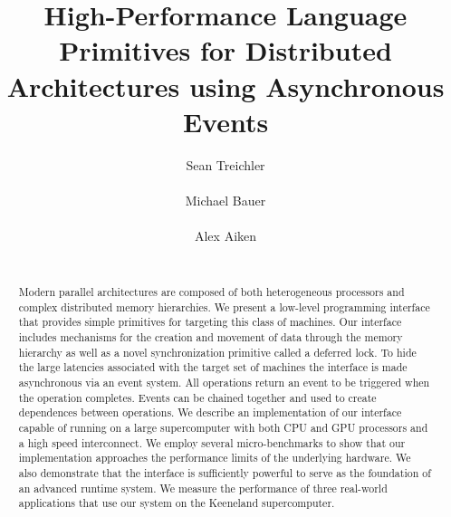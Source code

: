 \documentclass{sig-alternate}
\begin{document}
\title{High-Performance Language Primitives for Distributed Architectures using Asynchronous Events}
\author{
\alignauthor Sean Treichler\\
              \\
\alignauthor Michael Bauer \\
              \\
\alignauthor Alex Aiken \\
              \\
}
\maketitle

\begin{abstract}
Modern parallel architectures are composed of both heterogeneous processors
and complex distributed memory hierarchies.  We present a low-level programming
interface that provides simple primitives for targeting this class of
machines.  Our interface includes mechanisms for the creation and movement
of data through the memory hierarchy as well as a novel synchronization primitive 
called a deferred lock.  To hide the large latencies associated with the target
set of machines the interface is made asynchronous via an event system.  All
operations return an event to be triggered when the operation completes.  Events
can be chained together and used to create dependences between operations.
We describe an implementation of our interface capable of running on
a large supercomputer with both CPU and GPU processors and a high speed interconnect.
We employ several micro-benchmarks to show that our implementation approaches
the performance limits of the underlying hardware.
We also demonstrate that the interface is sufficiently powerful to serve as the foundation 
of an advanced runtime system.  We measure the performance of three real-world applications
that use our system on the Keeneland supercomputer.
\end{abstract}

%









{
\small


}
\end{document}
